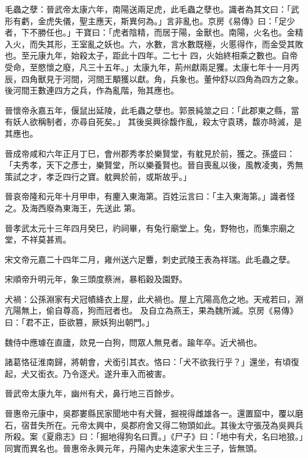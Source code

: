 \begin{pinyinscope}
 毛蟲之孽：晉武帝太康六年，南陽送兩足虎，此毛蟲之孽也。識者為其文曰：「武形有虧，金虎失儀，聖主應天，斯異何為。」言非亂也。京房《易傳》曰：「足少者，下不勝任也。」干寶曰：「虎者陰精，而居于陽，金獸也。南陽，火名也。金精入火，而失其形，王室亂之妖也。六，水數，言水數既極，火慝得作，而金受其敗也。至元康九年，始殺太子，距此十四年。二七十
 四，火始終相乘之數也。自帝受命，至愍懷之廢，凡三十五年。」太康九年，荊州獻兩足玃。太康七年十一月丙辰，四角獸見于河間，河間王顒獲以獻。角，兵象也。董仲舒以四角為四方之象。後河間王數連四方之兵，作為亂階，殆其應也。



 晉懷帝永嘉五年，偃鼠出延陵，此毛蟲之孽也。郭景純筮之曰：「此郡東之縣，當有妖人欲稱制者，亦尋自死矣。」
 其後吳興徐馥作亂，殺太守袁琇，馥亦時滅，是其應也。



 晉成帝咸和六年正月丁巳，會州郡秀孝於樂賢堂，有躭見於前，獲之。孫盛曰：「夫秀孝，天下之彥士，樂賢堂，所以樂養賢也。晉自喪亂以後，風教凌夷，秀無策試之才，孝乏四行之寶。躭興於前，或斯故乎。」



 晉哀帝隆和元年十月甲申，有麈入東海第。百姓沄言曰：「主入東海第。」識者怪之。及海西廢為東海王，先送此
 第。



 晉孝武太元十三年四月癸巳，礿祠畢，有兔行廟堂上。兔，野物也，而集宗廟之堂，不祥莫甚焉。



 宋文帝元嘉二十四年二月，雍州送六足麞，刺史武陵王表為祥瑞。此毛蟲之孽。



 宋順帝升明元年，象三頭度蔡洲，暴稻穀及園野。



 犬禍：公孫淵家有犬冠幘絳衣上屋，此犬禍也。屋上亢陽高危之地。天戒若曰，淵亢陽無上，偷自尊高，狗而冠者也。
 及自立為燕王，果為魏所滅。京房《易傳》曰：「君不正，臣欲篡，厥妖狗出朝門。」



 魏侍中應璩在直廬，欻見一白狗，問眾人無見者。踰年卒。近犬禍也。



 諸葛恪征淮南歸，將朝會，犬銜引其衣。恪曰：「犬不欲我行乎？」還坐，有頃復起，犬又銜衣。乃令逐犬。遂升車入而被害。



 晉武帝太康九年，幽州有犬，鼻行地三百餘步。



 晉惠帝元康中，吳郡婁縣民家聞地中有犬聲，掘視得雌雄各一。還置窟中，覆以磨石，宿昔失所在。元帝太興中，吳郡府舍又得二物頭如此。其後太守張茂為吳興兵所殺。案《夏鼎志》曰：「掘地得狗名曰賈。」《尸子》曰：「地中有犬，名曰地狼。」同實而異名也。晉惠帝永興元年，丹陽內史朱逵家犬生三子，皆無頭。




\end{pinyinscope}
